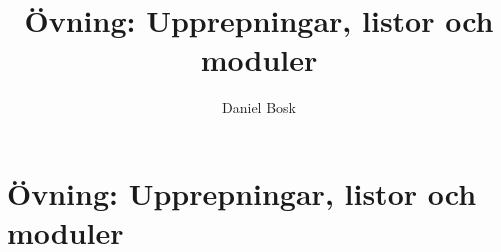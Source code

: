 \documentclass[a4paper,10pt,oneside,openright,
               oldfontcommands]{memoir}
\begin{document}
\title{%
  Övning: Upprepningar, listor och moduler
}
\author{Daniel Bosk}

\maketitle

\begin{abstract}
  
\end{abstract}

\clearpage

\tableofcontents*

\chapter{Övning: Upprepningar, listor och moduler}



\appendix


\printbibliography
\end{document}
